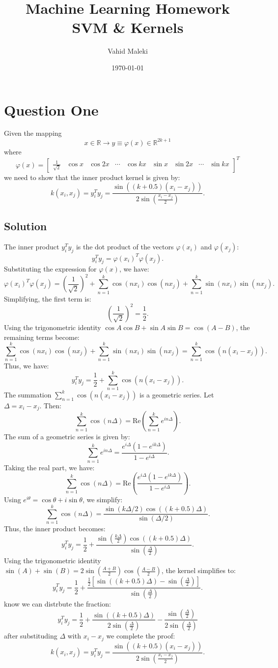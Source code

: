 \documentclass[a4paper, 11pt]{article}
\title{Machine Learning Homework \\SVM \& Kernels}
\author{Vahid Maleki}
\date{\today}
\begin{document}
	\maketitle
	\section{Question One}
	
	Given the mapping 
	\[
	x \in \mathbb{R} \to y \equiv \varphi(x) \in \mathbb{R}^{2k+1}
	\]
	where
	\[
	\varphi(x) = 
	\begin{bmatrix} 
		\frac{1}{\sqrt{2}} & \cos x & \cos 2x & \cdots & \cos kx & \sin x & \sin 2x & \cdots & \sin kx 
	\end{bmatrix}^T
	\]
	we need to show that the inner product kernel is given by:
	\[
	k(x_i, x_j) = y_i^T y_j = \frac{\sin((k + 0.5)(x_i - x_j))}{2\sin\left(\frac{x_i - x_j}{2}\right)}.
	\]
	\subsection*{Solution}
	The inner product $y_i^T y_j$ is the dot product of the vectors $\varphi(x_i)$ and $\varphi(x_j)$:
	\[
	y_i^T y_j = \varphi(x_i)^T \varphi(x_j).
	\]
	Substituting the expression for $\varphi(x)$, we have:
	\[
	\varphi(x_i)^T \varphi(x_j) = \left(\frac{1}{\sqrt{2}}\right)^2 + \sum_{n=1}^k \cos(nx_i)\cos(nx_j) + \sum_{n=1}^k \sin(nx_i)\sin(nx_j).
	\]
	Simplifying, the first term is:
	\[
	\left(\frac{1}{\sqrt{2}}\right)^2 = \frac{1}{2}.
	\]
	Using the trigonometric identity $\cos A \cos B + \sin A \sin B = \cos(A - B)$, the remaining terms become:
	\[
	\sum_{n=1}^k \cos(nx_i)\cos(nx_j) + \sum_{n=1}^k \sin(nx_i)\sin(nx_j) = \sum_{n=1}^k \cos(n(x_i - x_j)).
	\]
	Thus, we have:
	\[
	y_i^T y_j = \frac{1}{2} + \sum_{n=1}^k \cos(n(x_i - x_j)).
	\]
	The summation $\sum_{n=1}^k \cos(n(x_i - x_j))$ is a geometric series. Let $\Delta = x_i - x_j$. Then:
	\[
	\sum_{n=1}^k \cos(n\Delta) = \text{Re} \left( \sum_{n=1}^k e^{in\Delta} \right).
	\]
	The sum of a geometric series is given by:
	\[
	\sum_{n=1}^k e^{in\Delta} = \frac{e^{i\Delta}(1 - e^{ik\Delta})}{1 - e^{i\Delta}}.
	\]
	Taking the real part, we have:
	\[
	\sum_{n=1}^k \cos(n\Delta) = \text{Re} \left( \frac{e^{i\Delta}(1 - e^{ik\Delta})}{1 - e^{i\Delta}} \right).
	\]
	Using $e^{i\theta} = \cos\theta + i\sin\theta$, we simplify:
	\[
	\sum_{n=1}^k \cos(n\Delta) = \frac{\sin(k\Delta/2)\cos((k+0.5)\Delta)}{\sin(\Delta/2)}.
	\]
	Thus, the inner product becomes:
	\[
	y_i^T y_j = \frac{1}{2} + \frac{\sin(\frac{k\Delta}{2})\cos((k+0.5)\Delta)}{\sin(\frac{\Delta}{2})}.
	\]
	Using the trigonometric identity $\sin(A) + \sin(B) = 2\sin\left(\frac{A+B}{2}\right)\cos\left(\frac{A-B}{2}\right)$, the kernel simplifies to:
	\[
	y_i^T y_j = \frac{1}{2} + \frac{\frac{1}{2} \left[ \sin\left((k+0.5)\Delta\right) - \sin\left(\frac{\Delta}{2}\right) \right]}{\sin(\frac{\Delta}{2})}.
	\]
	know we can distrbute the fraction:
	\[ 
	y_i^T y_j = \frac{1}{2} + \frac{\sin((k+0.5)\Delta)}{2\sin(\frac{\Delta}{2})} - \frac{\sin(\frac{\Delta}{2})}{2\sin(\frac{\Delta}{2})} 
	\]
	after substituding $\Delta$ with $x_i - x_j$ we complete the proof:
	\[
	k(x_i, x_j) = y_i^T y_j = \frac{\sin((k + 0.5)(x_i - x_j))}{2\sin\left(\frac{x_i - x_j}{2}\right)}.
	\]
	
\end{document}
